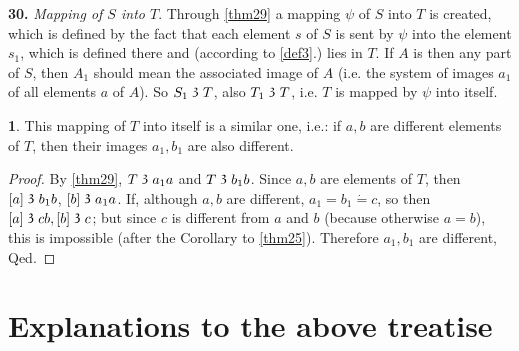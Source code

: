 \documentclass[leqno,hidelinks,a4paper]{article}
\theoremstyle{definition}
\newtheorem{satz}{\protect\satzname}
\newcommand{\satzname}{}
\renewcommand{\satzname}{\hspace{-4pt}.\ Satz}%
\renewcommand{\satzname}{\hspace{-4pt}.\ Theorem}%
\newcommand\partof{\mathrel{\raisebox{0.45ex}{$\mathfrak{3}$}}}
\begin{document}
\noindent \textbf{30.}\label{thm30} \hspace{-4pt} \emph{Mapping of $S$ into $T$}. Through \ref{thm29} a mapping $\psi$ of $S$ into $T$ is created, which is defined by the fact that each element $s$ of $S$ is sent by $\psi$ into the element $s_1$, which is defined there and (according to \ref{def3}.) lies in $T$.
If $A$ is then any part of $S$, then $A_1$ should mean the associated image of $A$ (i.e. the system of images $a_1$ of all elements $a$ of $A$). So $S_1 \partof T$, also $T_1 \partof T$, i.e. $T$ is mapped by $\psi$ into itself.

\begin{satz}\label{thm31}
This mapping of $T$ into itself is a similar one, i.e.: if $a, b$ are different elements of $T$, then their images $a_1, b_1$ are also different.
\end{satz}

\begin{proof}
By \ref{thm29}, $T \partof a_1a$ and $T \partof b_1b$. Since $a, b$ are elements of $T$, then $[a] \partof b_1b$, $[b] \partof a_1a$. If, although $a, b$ are different, $a_1 = b_1  \dot{=}
c$, so then $[a] \partof cb, [b] \partof c$; but since $c$ is different from $a$ and $b$ (because otherwise $a=b$), this is impossible (after the Corollary to \ref{thm25}). Therefore $a_1, b_1$ are different, Qed.
\end{proof}

\section*{Explanations to the above treatise}
\end{document}
